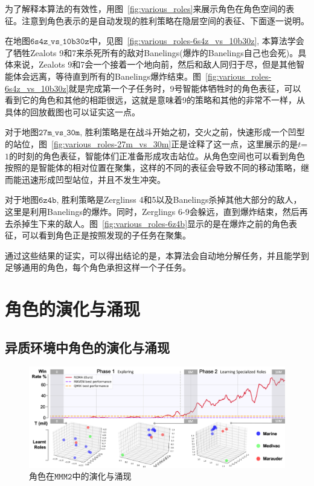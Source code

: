 为了解释本算法的有效性，用图~\ref{fig:various_roles}来展示角色在角色空间的表征。注意到角色表示的是自动发现的胜利策略在隐层空间的表征、下面逐一说明。

在地图$\mathtt{6s4z\_vs\_10b30z}$中，见图~\ref{fig:various_roles-6s4z_vs_10b30z}, 本算法学会了牺牲Zealots 9和7来杀死所有的敌对Banelings(爆炸的Banelings自己也会死)。具体来说，Zealots 9和7会一个接着一个地向前，然后和敌人同归于尽，但是其他智能体会远离，等待直到所有的Banelings爆炸结束。图~\ref{fig:various_roles-6s4z_vs_10b30z}就是完成第一个子任务时，9号智能体牺牲时的角色表征，可以看到它的角色和其他的相距很远，这就是意味着9的策略和其他的非常不一样，从具体的回放截图也可以证实这一点。

对于地图$\mathtt{27m\_vs\_30m}$, 胜利策略是在战斗开始之初，交火之前，快速形成一个凹型的站位，图~\ref{fig:various_roles-27m_vs_30m}正是诠释了这一点，这里展示的是$t$=$1$的时刻的角色表征，智能体们正准备形成攻击站位。从角色空间也可以看到角色按照的是智能体的相对位置在聚集，这样的不同的表征会导致不同的移动策略，继而能迅速形成凹型站位，并且不发生冲突。

对于地图$\mathtt{6z4b}$, 胜利策略是Zerglinss 4和5以及Banelings杀掉其他大部分的敌人，这里是利用Banelings的爆炸。同时，Zerglings 6-9会躲远，直到爆炸结束，然后再去杀掉生下来的敌人。图~\ref{fig:various_roles-6z4b}显示的是在爆炸之前的角色表征，可以看到角色正是按照发现的子任务在聚集。

通过这些结果的证实，可以得出结论的是，本算法会自动地分解任务，并且能学到足够通用的角色，每个角色承担这样一个子任务。

\section{角色的演化与涌现}\label{sec:role-evolution}

\subsection{异质环境中角色的演化与涌现}
\begin{figure}
  \centering
  \includegraphics[width=\linewidth]{figures/evolution/evolution_MMM2.png}
  \caption{角色在$\mathtt{MMM2}$中的演化与涌现}
  \label{fig:role_evolution-heter}
\end{figure}

